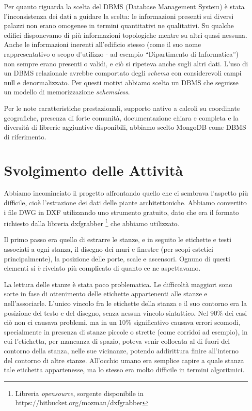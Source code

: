 \documentclass[12pt]{report}
\begin{document}
Per quanto riguarda la scelta del DBMS (Database Management System) è stata l'inconsistenza dei dati a guidare la scelta: le informazioni presenti sui diversi palazzi non erano omogenee in termini quantitativi ne qualitativi. Su qualche edifici disponevamo di più informazioni topologiche mentre su altri quasi nessuna. Anche le informazioni inerenti all'edificio stesso (come il suo nome rappresentativo o scopo d'utilizzo - ad esempio ``Dipartimento di Informatica'') non sempre erano presenti o validi, e ciò si ripeteva anche sugli altri dati. L'uso di un DBMS relazionale avrebbe comportato degli \textit{schema} con considerevoli campi null e denormalizzato. Per questi motivi abbiamo scelto un DBMS che seguisse un modello di memorizzazione \textit{schemaless}. 

Per le note caratteristiche prestazionali, supporto nativo a calcoli su coordinate geografiche, presenza di forte comunità, documentazione chiara e completa e la diversità di librerie aggiuntive disponibili, abbiamo scelto MongoDB come DBMS di riferimento.


% 
% 
\chapter{Svolgimento delle Attività}
\label{cap3}

Abbiamo incominciato il progetto affrontando quello che ci sembrava l'aspetto più difficile, cioè l'estrazione dei dati delle piante architettoniche. Abbiamo convertito i file DWG in DXF utilizzando uno strumento gratuito, dato che era il formato richiesto dalla libreria dxfgrabber \footnote{Libreria \textit{opensource}, sorgente disponibile in https://bitbucket.org/mozman/dxfgrabber} che abbiamo utilizzato.

Il primo passo era quello di estrarre le stanze, e in seguito le etichette e testi associati a ogni stanza, il disegno dei muri e finestre (per scopi estetici principalmente), la posizione delle porte, scale e ascensori. Ognuno di questi elementi si è rivelato più complicato di quanto ce ne aspettavamo.

La lettura delle stanze è stata poco problematica. Le difficoltà maggiori sono sorte in fase di ottenimento delle etichette appartenenti alle stanze e nell'associarle. L'unico vincolo fra le etichette della stanza e il suo contorno era la posizione del testo e del disegno, senza nessun vincolo sintattico. Nel 90\% dei casi ciò non ci causava problemi, ma in un 10\% significativo causava errori scomodi, specialmente in presenza di stanze piccole o strette (come corridoi ad esempio), in cui l'etichetta, per mancanza di spazio, poteva venir collocata al di fuori del contorno della stanza, nelle sue vicinanze, potendo addirittura finire all'interno del contorno di altre stanze. All'occhio umano era semplice capire a quale stanza tale etichetta appartenesse, ma lo stesso era molto difficile in termini algoritmici.
\end{document}
